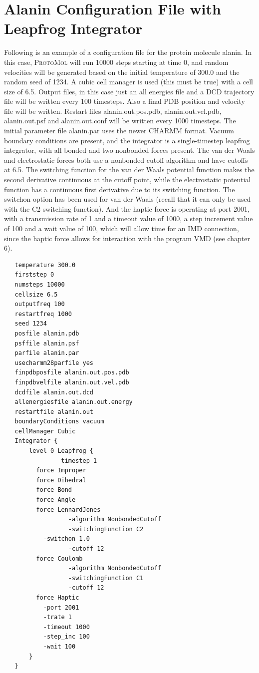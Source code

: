 \documentclass[11pt]{report}
\newcommand{\ProtoMol}{\textsc{ProtoMol }}
\begin{document}
\section{Alanin Configuration File with Leapfrog Integrator}
\label{sec:alanin}

Following is an example of a configuration file for the protein
molecule alanin.  In this case, \ProtoMol will run 10000 steps
starting at time 0, and random velocities will be generated based on
the initial temperature of 300.0 and the random seed of 1234.  A cubic
cell manager is used (this must be true) with a cell size of 6.5.
Output files, in this case just an all energies file and a DCD
trajectory file will be written every 100 timesteps.  Also a final PDB
position and velocity file will be written.  Restart files
alanin.out.pos.pdb, alanin.out.vel.pdb, alanin.out.psf and
alanin.out.conf will be written every 1000 timesteps.  The initial
parameter file alanin.par uses the newer CHARMM format.  Vacuum
boundary conditions are present, and the integrator is a
single-timestep leapfrog integrator, with all bonded and two nonbonded
forces present.  The van der Waals and electrostatic forces both use a
nonbonded cutoff algorithm and have cutoffs at 6.5.  The switching
function for the van der Waals potential function makes the second
derivative continuous at the cutoff point, while the electrostatic
potential function has a continuous first derivative due to its
switching function.  The switchon option has been used for van der
Waals (recall that it can only be used with the C2 switching
function).  And the haptic force is operating at port 2001, with a
transmission rate of 1 and a timeout value of 1000, a step increment
value of 100 and a wait value of 100, which will allow time for an IMD
connection, since the haptic force allows for interaction with the
program VMD (see chapter 6).
\clearpage
\begin{verbatim}        
   temperature 300.0 
   firststep 0
   numsteps 10000
   cellsize 6.5
   outputfreq 100
   restartfreq 1000      
   seed 1234
   posfile alanin.pdb
   psffile alanin.psf
   parfile alanin.par
   usecharmm28parfile yes
   finpdbposfile alanin.out.pos.pdb
   finpdbvelfile alanin.out.vel.pdb
   dcdfile alanin.out.dcd
   allenergiesfile alanin.out.energy
   restartfile alanin.out  
   boundaryConditions vacuum
   cellManager Cubic
   Integrator {
       level 0 Leapfrog {
                timestep 1
         force Improper 
         force Dihedral
         force Bond
         force Angle 
         force LennardJones
                  -algorithm NonbondedCutoff
                  -switchingFunction C2
           -switchon 1.0
                  -cutoff 12
         force Coulomb
                  -algorithm NonbondedCutoff
                  -switchingFunction C1
                  -cutoff 12
         force Haptic
           -port 2001
           -trate 1
           -timeout 1000
           -step_inc 100
           -wait 100
       }
   }
\end{verbatim}
\end{document}
